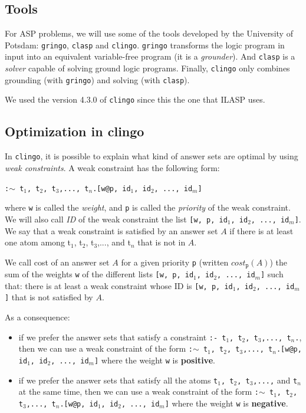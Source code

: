 \subsection{Tools}

For ASP problems, we will use some of the tools developed by the University of Potsdam: \texttt{gringo}, \texttt{clasp} and \texttt{clingo}. \texttt{gringo} transforms the logic program in input into an equivalent variable-free program (it is a \textit{grounder}). And \texttt{clasp} is a \textit{solver} capable of solving ground logic programs. Finally, \texttt{clingo} only combines grounding (with \texttt{gringo}) and solving (with \texttt{clasp}).

\smallskip

We used the version 4.3.0 of \texttt{clingo} since this the one that ILASP uses.

\subsection{Optimization in clingo}

In \texttt{clingo}, it is possible to explain what kind of answer sets are optimal by using \textit{weak constraints}. A weak constraint has the following form:
\begin{center}
\texttt{:$\sim$ t$_1$, t$_2$, t$_3$,..., t$_n$.[w@p, id$_1$, id$_2$, ..., id$_m$]}
\end{center}
where \texttt{w} is called the \textit{weight}, and \texttt{p} is called the \textit{priority} of the weak constraint. We will also call \textit{ID} of the weak constraint the list \texttt{[\texttt{w}, \texttt{p}, id$_1$, id$_2$, ..., id$_m$]}. We say that a weak constraint is satisfied by an answer set $A$ if there is at least one atom among t$_1$, t$_2$, t$_3$,..., and t$_n$ that is not in $A$.

\smallskip

We call cost of an answer set $A$ for a given priority \texttt{p} (written $cost_{\texttt{p}}(A)$) the sum of the weights \texttt{w} of the different lists \texttt{[\texttt{w}, \texttt{p}, id$_1$, id$_2$, ..., id$_m$]} such that: there is at least a weak constraint whose ID is  \texttt{[\texttt{w}, \texttt{p}, id$_1$, id$_2$, ..., id$_m$]} that is not satisfied by $A$.

\bigskip

As a consequence:
\begin{itemize}
\item if we prefer the answer sets that satisfy a constraint \texttt{:- t$_1$, t$_2$, t$_3$,..., t$_n$.}, then we can use a weak constraint of the form \texttt{:$\sim$ t$_1$, t$_2$, t$_3$,..., t$_n$.[w@p, id$_1$, id$_2$, ..., id$_m$]} where the weight \texttt{w} is \textbf{positive}.
\item if we prefer the answer sets that satisfy all the atoms \texttt{t$_1$, t$_2$, t$_3$,...,} and \texttt{t$_n$} at the same time, then we can use a weak constraint of the form \texttt{:$\sim$ t$_1$, t$_2$, t$_3$,..., t$_n$.[w@p, id$_1$, id$_2$, ..., id$_m$]} where the weight \texttt{w} is \textbf{negative}.
\end{itemize}

